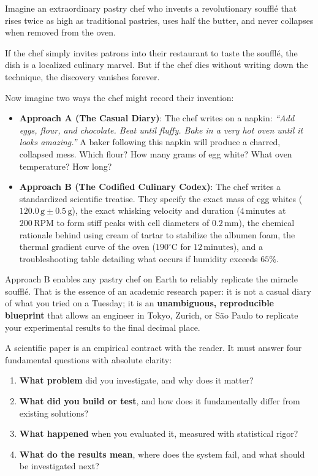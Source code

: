 \begin{analogy}
Imagine an extraordinary pastry chef who invents a revolutionary souffl\'e that rises twice as high as traditional pastries, uses half the butter, and never collapses when removed from the oven.

If the chef simply invites patrons into their restaurant to taste the souffl\'e, the dish is a localized culinary marvel. But if the chef dies without writing down the technique, the discovery vanishes forever.

Now imagine two ways the chef might record their invention:
\begin{itemize}
    \item \textbf{Approach A (The Casual Diary)}: The chef writes on a napkin: \emph{``Add eggs, flour, and chocolate. Beat until fluffy. Bake in a very hot oven until it looks amazing.''} A baker following this napkin will produce a charred, collapsed mess. Which flour? How many grams of egg white? What oven temperature? How long?
    \item \textbf{Approach B (The Codified Culinary Codex)}: The chef writes a standardized scientific treatise. They specify the exact mass of egg whites ($120.0\,\text{g} \pm 0.5\,\text{g}$), the exact whisking velocity and duration ($4\,\text{minutes}$ at $200\,\text{RPM}$ to form stiff peaks with cell diameters of $0.2\,\text{mm}$), the chemical rationale behind using cream of tartar to stabilize the albumen foam, the thermal gradient curve of the oven ($190^\circ\text{C}$ for $12\,\text{minutes}$), and a troubleshooting table detailing what occurs if humidity exceeds $65\%$.
\end{itemize}
Approach B enables any pastry chef on Earth to reliably replicate the miracle souffl\'e. That is the essence of an academic research paper: it is not a casual diary of what you tried on a Tuesday; it is an \textbf{unambiguous, reproducible blueprint} that allows an engineer in Tokyo, Zurich, or S\~ao Paulo to replicate your experimental results to the final decimal place.
\end{analogy}

\begin{keyidea}
A scientific paper is an empirical contract with the reader. It must answer four fundamental questions with absolute clarity:
\begin{enumerate}
    \item \textbf{What problem} did you investigate, and why does it matter?
    \item \textbf{What did you build or test}, and how does it fundamentally differ from existing solutions?
    \item \textbf{What happened} when you evaluated it, measured with statistical rigor?
    \item \textbf{What do the results mean}, where does the system fail, and what should be investigated next?
\end{enumerate}
\end{keyidea}

